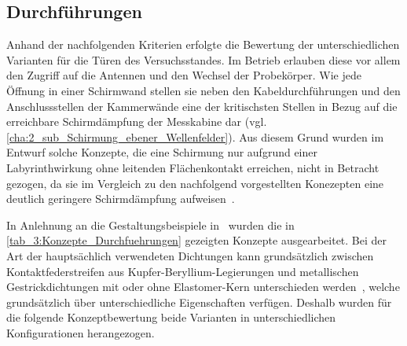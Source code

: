



\subsection{Durchführungen}\label{cha:3_sub_Durchfuehrungen}

Anhand der nachfolgenden Kriterien erfolgte die Bewertung der unterschiedlichen Varianten für die Türen des Versuchsstandes. Im Betrieb erlauben diese vor allem den Zugriff auf die Antennen und den Wechsel der Probekörper. Wie jede Öffnung in einer Schirmwand stellen sie neben den Kabeldurchführungen und den Anschlussstellen der Kammerwände eine der kritischsten Stellen in Bezug auf die erreichbare Schirmdämpfung der Messkabine dar (vgl. \Abschnitt\ref{cha:2_sub_Schirmung_ebener_Wellenfelder}). Aus diesem Grund wurden im Entwurf solche Konzepte, die eine Schirmung nur aufgrund einer Labyrinthwirkung ohne leitenden Flächenkontakt erreichen, nicht in Betracht gezogen, da sie im Vergleich zu den nachfolgend vorgestellten Konezepten eine deutlich geringere Schirmdämpfung aufweisen~\cite{Design_of_shielded_enclosures}.
\par
\vspace{\linespace}
In Anlehnung an die Gestaltungsbeispiele in~\cite{EM_Schirmung, Design_of_shielded_enclosures} wurden die in \Tabelle\ref{tab_3:Konzepte_Durchfuehrungen} gezeigten Konzepte ausgearbeitet. Bei der Art der hauptsächlich verwendeten Dichtungen kann grundsätzlich zwischen Kontaktfederstreifen aus Kupfer-Beryllium-Legierungen und metallischen Gestrickdichtungen mit oder ohne Elastomer-Kern unterschieden werden~\cite{EM_Schirmung}, welche grundsätzlich über unterschiedliche Eigenschaften verfügen. Deshalb wurden für die folgende Konzeptbewertung beide Varianten in unterschiedlichen Konfigurationen herangezogen.



